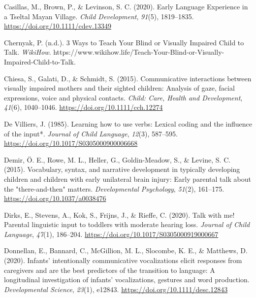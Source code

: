 \documentclass[
  man]{apa6}
\newlength{\cslhangindent}
\newlength{\cslentryspacingunit} %
\newenvironment{CSLReferences}[2] %
 {%
  \setlength{\parindent}{0pt}
  \ifodd #1
  \let\oldpar\par
  \def\par{\hangindent=\cslhangindent\oldpar}
  \fi
  \setlength{\parskip}{#2\cslentryspacingunit}
 }%
 {}
\begin{document}
\begin{CSLReferences}{1}{0}
\leavevmode{}%
Casillas, M., Brown, P., \& Levinson, S. C. (2020). Early {Language Experience} in a {Tseltal Mayan Village}. \emph{Child Development}, \emph{91}(5), 1819--1835. \url{https://doi.org/10.1111/cdev.13349}

\leavevmode{}%
Chernyak, P. (n.d.). 3 {Ways} to {Teach Your Blind} or {Visually Impaired Child} to {Talk}. \emph{WikiHow}. https://www.wikihow.life/Teach-Your-Blind-or-Visually-Impaired-Child-to-Talk.

\leavevmode{}%
Chiesa, S., Galati, D., \& Schmidt, S. (2015). Communicative interactions between visually impaired mothers and their sighted children: Analysis of gaze, facial expressions, voice and physical contacts. \emph{Child: Care, Health and Development}, \emph{41}(6), 1040--1046. \url{https://doi.org/10.1111/cch.12274}

\leavevmode{}%
De Villiers, J. (1985). Learning how to use verbs: Lexical coding and the influence of the input*. \emph{Journal of Child Language}, \emph{12}(3), 587--595. \url{https://doi.org/10.1017/S0305000900006668}

\leavevmode{}%
Demir, Ö. E., Rowe, M. L., Heller, G., Goldin-Meadow, S., \& Levine, S. C. (2015). Vocabulary, syntax, and narrative development in typically developing children and children with early unilateral brain injury: Early parental talk about the "there-and-then" matters. \emph{Developmental Psychology}, \emph{51}(2), 161--175. \url{https://doi.org/10.1037/a0038476}

\leavevmode{}%
Dirks, E., Stevens, A., Kok, S., Frijns, J., \& Rieffe, C. (2020). Talk with me! {Parental} linguistic input to toddlers with moderate hearing loss. \emph{Journal of Child Language}, \emph{47}(1), 186--204. \url{https://doi.org/10.1017/S0305000919000667}

\leavevmode{}%
Donnellan, E., Bannard, C., McGillion, M. L., Slocombe, K. E., \& Matthews, D. (2020). Infants' intentionally communicative vocalizations elicit responses from caregivers and are the best predictors of the transition to language: {A} longitudinal investigation of infants' vocalizations, gestures and word production. \emph{Developmental Science}, \emph{23}(1), e12843. \url{https://doi.org/10.1111/desc.12843}


\end{CSLReferences}
\end{document}
